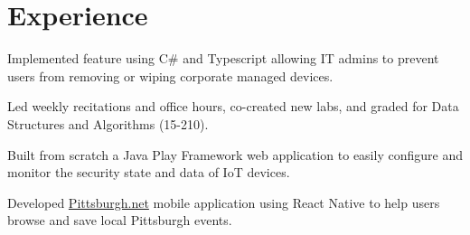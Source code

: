 \documentclass[]{openfont}
\begin{document}
\begin{minipage}[t]{0.60\textwidth} 


\section{Experience}

\vspace{\topsep} %
\begin{tightemize}
    \item Implemented feature using C\# and Typescript allowing IT admins to
        prevent users from removing or wiping corporate managed devices.
\end{tightemize}

\vspace{\topsep} %
\begin{tightemize}
    \item Led weekly recitations and office hours, co-created new labs, and
        graded for Data Structures and Algorithms (15-210).
\end{tightemize}

\vspace{\topsep} %
\begin{tightemize}
    \item Built from scratch a Java Play Framework web application to easily configure and monitor the security state and data of IoT devices.
\end{tightemize}

\vspace{\topsep} %
\begin{tightemize}
    \item Developed \href{http://www.pittsburgh.net/}{Pittsburgh.net} mobile
        application using React Native to help users browse and save local
        Pittsburgh events.
\end{tightemize}


\end{minipage}
\end{document}
